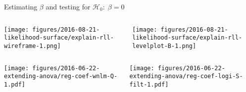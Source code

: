 \documentclass{beamer}
\newcommand{\ownfigscale}[0]{0.4}
\begin{document}
\begin{frame}[label=ll-surface]{Estimating \(\beta\) and testing for \(\mathcal{H}_0:\;\beta=0\)}
\begin{columns}[t]
\begin{column}{0.5\textwidth}

\texttt{[image: figures/2016-08-21-likelihood-surface/explain-rll-wireframe-1.png]}
\end{column}

\begin{column}{0.5\textwidth}

\texttt{[image: figures/2016-08-21-likelihood-surface/explain-rll-levelplot-B-1.png]}
\end{column}
\end{columns}
\end{frame}

\begin{frame}[plain, label=all-betas]
\begin{columns}[t]
\begin{column}{0.5\textwidth}

\texttt{[image: figures/2016-06-22-extending-anova/reg-coef-wnlm-Q-1.pdf]}
\end{column}

\begin{column}{0.5\textwidth}

\texttt{[image: figures/2016-06-22-extending-anova/reg-coef-logi-S-filt-1.pdf]}
\end{column}
\end{columns}
\end{frame}
\end{document}
